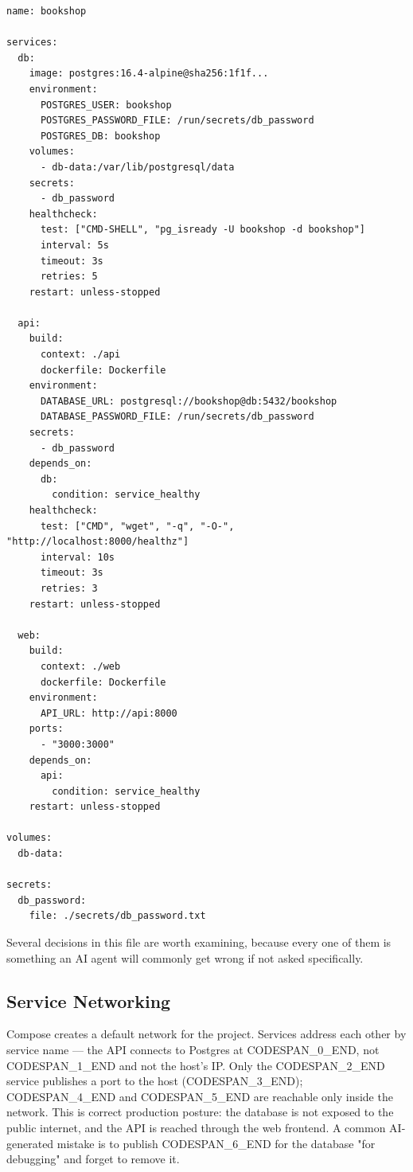 \documentclass[11pt,a4paper]{book}
\begin{document}
\begin{lstlisting}
name: bookshop

services:
  db:
    image: postgres:16.4-alpine@sha256:1f1f...
    environment:
      POSTGRES_USER: bookshop
      POSTGRES_PASSWORD_FILE: /run/secrets/db_password
      POSTGRES_DB: bookshop
    volumes:
      - db-data:/var/lib/postgresql/data
    secrets:
      - db_password
    healthcheck:
      test: ["CMD-SHELL", "pg_isready -U bookshop -d bookshop"]
      interval: 5s
      timeout: 3s
      retries: 5
    restart: unless-stopped

  api:
    build:
      context: ./api
      dockerfile: Dockerfile
    environment:
      DATABASE_URL: postgresql://bookshop@db:5432/bookshop
      DATABASE_PASSWORD_FILE: /run/secrets/db_password
    secrets:
      - db_password
    depends_on:
      db:
        condition: service_healthy
    healthcheck:
      test: ["CMD", "wget", "-q", "-O-", "http://localhost:8000/healthz"]
      interval: 10s
      timeout: 3s
      retries: 3
    restart: unless-stopped

  web:
    build:
      context: ./web
      dockerfile: Dockerfile
    environment:
      API_URL: http://api:8000
    ports:
      - "3000:3000"
    depends_on:
      api:
        condition: service_healthy
    restart: unless-stopped

volumes:
  db-data:

secrets:
  db_password:
    file: ./secrets/db_password.txt
\end{lstlisting}

Several decisions in this file are worth examining, because every one of them is something an AI agent will commonly get wrong if not asked specifically.

\subsection{Service Networking}

Compose creates a default network for the project. Services address each other by service name --- the API connects to Postgres at CODESPAN\_0\_END, not CODESPAN\_1\_END and not the host's IP. Only the CODESPAN\_2\_END service publishes a port to the host (CODESPAN\_3\_END); CODESPAN\_4\_END and CODESPAN\_5\_END are reachable only inside the network. This is correct production posture: the database is not exposed to the public internet, and the API is reached through the web frontend. A common AI-generated mistake is to publish CODESPAN\_6\_END for the database "for debugging" and forget to remove it.
\end{document}
